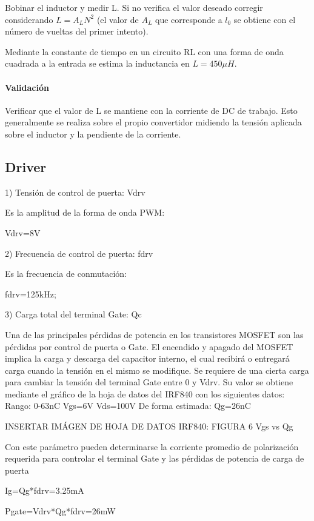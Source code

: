 Bobinar el inductor y medir L. Si no verifica el valor deseado corregir
considerando $L = A_LN^2$ (el valor de $A_L$ que corresponde a $l_0$ se obtiene con
el número de vueltas del primer intento).

Mediante la constante de tiempo en un circuito RL con una forma de onda cuadrada a la entrada se estima la inductancia en $L=450\mu H$. 

\paragraph{Validación}

Verificar que el valor de L se mantiene con la corriente de DC de trabajo.
Esto generalmente se realiza sobre el propio convertidor midiendo la
tensión aplicada sobre el inductor y la pendiente de la corriente.

\subsection{Driver}

1) Tensión de control de puerta: Vdrv

Es la amplitud de la forma de onda PWM:  

Vdrv=8V

2) Frecuencia de control de puerta: fdrv

Es la frecuencia de conmutación: 

fdrv=125kHz;

3) Carga total del terminal Gate: Qc

Una de las principales pérdidas de potencia en los transistores MOSFET son las pérdidas por control de puerta o Gate. 
El encendido y apagado del MOSFET implica la carga y descarga del capacitor interno, 
el cual recibirá o entregará carga cuando la tensión en el mismo se modifique. 
Se requiere de una cierta carga para cambiar la tensión del terminal Gate entre 0 y Vdrv. 
Su valor se obtiene mediante el gráfico de la hoja de datos del IRF840 con los siguientes datos:
Rango: 0-63nC
Vgs=6V
Vds=100V
De forma estimada: 
Qg=26nC

INSERTAR IMÁGEN DE HOJA DE DATOS IRF840: FIGURA 6 Vgs vs Qg

Con este parámetro pueden determinarse la corriente promedio de polarización requerida para controlar el terminal Gate 
y las pérdidas de potencia de carga de puerta

Ig=Qg*fdrv=3.25mA

Pgate=Vdrv*Qg*fdrv=26mW

